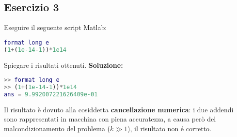 \subsection{Esercizio 3}
Eseguire il seguente script Matlab:
\begin{lstlisting}[language=Matlab]
format long e
(1+(1e-14-1))*1e14
\end{lstlisting}
Spiegare i risultati ottenuti.
\newline \textbf{Soluzione:} \newline
\begin{lstlisting}[language=Matlab]
>> format long e
>> (1+(1e-14-1))*1e14
ans = 9.992007221626409e-01
\end{lstlisting}
Il risultato è dovuto alla cosiddetta \textbf{cancellazione numerica}:
i due addendi sono rappresentati in macchina con piena accuratezza, a causa però del
malcondizionamento del problema ($k \gg 1$), il risultato non é corretto.
